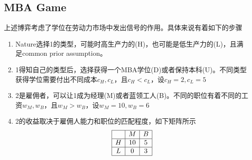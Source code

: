\documentclass[UTF8,12pt]{ctexart}
\numberwithin{equation}{section} %
\numberwithin{figure}{section}
\numberwithin{table}{section}
\begin{document}
	\subsection{MBA Game}
	上述博弈考虑了学位在劳动力市场中发出信号的作用。具体来说有着如下的步骤
	\begin{enumerate}
		\item Nature选择1的类型，可能时高生产力的(H)，也可能是低生产力的(L)，且满足common prior assumption。
		
		\item 1得知自己的类型后，选择获得一个MBA学位(D)或者保持本科(U)。不同类型获得学位需要付出不同成本$c_H,c_L$，且$c_H < c_L$，设$c_H = 2,c_L = 5$
		
		\item 2是雇佣者，可以让1成为经理(M)或者蓝领工人(B)。不同的职位有着不同的工资$w_M,w_B$，且$w_M > w_B$，设$w_M = 10,w_B = 6$
		
		\item 2的收益取决于雇佣人能力和职位的匹配程度，如下矩阵所示
		\begin{equation}
			\begin{array}{|c|c|c|}
				\hline
				 & M & B \\
				 \hline
				 H & 10 & 5 \\
				 \hline
				 L & 0 & 3 \\
				 \hline
			\end{array}
		\end{equation}
	\end{enumerate}
\end{document}
